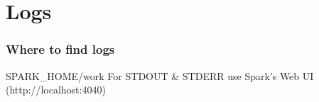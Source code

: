 \chapter{Logs}

\subsection{Where to find logs}
SPARK_HOME/work
For STDOUT & STDERR use Spark's Web UI (http://localhost:4040)